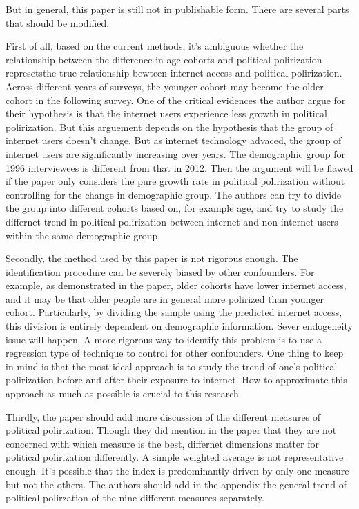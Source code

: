 \documentclass[12pt]{article}%
\theoremstyle{definition}
\numberwithin{equation}{section}
\begin{document}
But in general, this paper is still not in publishable form. There are several parts that should be modified.\par 

First of all, based on the current methods, it's ambiguous whether the relationship between the difference in age cohorts and political polirization represetsthe true relationship bewteen internet access and political polirization. Across different years of surveys, the younger cohort may become the older cohort in the following survey. One of the critical evidences the author argue for their hypothesis is that the internet users experience less growth in political polirization. But this arguement depends on the hypothesis that the group of internet users doesn't change. But as internet technology advaced, the group of internet users are significantly increasing over years. The demographic group for 1996 interviewees is different from that in 2012. Then the argument will be flawed if the paper only considers the pure growth rate in political polirization without controlling for the change in demographic group. The authors can try to divide the group into different cohorts based on, for example age, and try to study the differnet trend in political polirization between internet and non internet users within the same demographic group. \par

Secondly, the method used by this paper is not rigorous enough. The identification procedure can be severely biased by other confounders. For example, as demonstrated in the paper, older cohorts have lower internet access, and it may be that older people are in general more polirized than younger cohort. Particularly, by dividing the sample using the predicted internet access, this division is entirely dependent on demographic information. Sever endogeneity issue will happen. A more rigorous way to identify this problem is to use a regression type of technique to control for other confounders. One thing to keep in mind is that the most ideal approach is to study the trend of one's political polirization before and after their exposure to internet. How to approximate this approach as much as possible is crucial to this research. \par

Thirdly, the paper should add more discussion of the different measures of political polirization. Though they did mention in the paper that they are not concerned with which measure is the best, differnet dimensions matter for political polirization differently. A simple weighted average is not representative enough. It's possible that the index is predominantly driven by only one measure but not the others. The authors should add in the appendix the general trend of political polirzation of the nine different measures separately.
\end{document}
